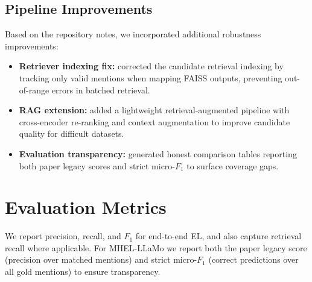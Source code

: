 \subsection{Pipeline Improvements}
Based on the repository notes, we incorporated additional robustness improvements:
\begin{itemize}
    \item \textbf{Retriever indexing fix:} corrected the candidate retrieval indexing by tracking only valid mentions when mapping FAISS outputs, preventing out-of-range errors in batched retrieval.
    \item \textbf{RAG extension:} added a lightweight retrieval-augmented pipeline with cross-encoder re-ranking and context augmentation to improve candidate quality for difficult datasets.
    \item \textbf{Evaluation transparency:} generated honest comparison tables reporting both paper legacy scores and strict micro-$F_1$ to surface coverage gaps.
\end{itemize}

\section{Evaluation Metrics}
We report precision, recall, and $F_1$ for end-to-end EL, and also capture retrieval recall where applicable. For MHEL-LLaMo we report both the paper legacy score (precision over matched mentions) and strict micro-$F_1$ (correct predictions over all gold mentions) to ensure transparency.
